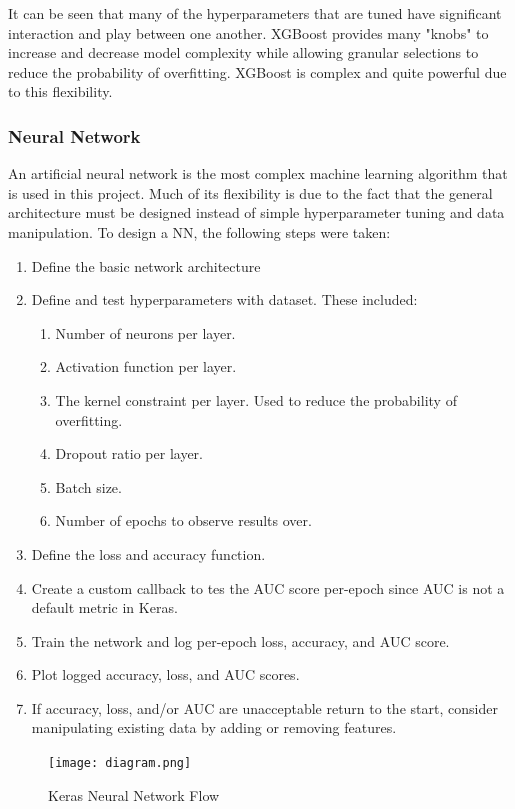 \documentclass[11pt]{article}
\begin{document}
	It can be seen that many of the hyperparameters that are tuned have significant interaction and play between one another. XGBoost provides many "knobs" to increase and decrease model complexity while allowing granular selections to reduce the probability of overfitting. XGBoost is complex and quite powerful due to this flexibility.
	
	\subsubsection{Neural Network}

    An artificial neural network is the most complex machine learning algorithm that is used in this project. Much of its flexibility is due to the fact that the general architecture must be designed instead of simple hyperparameter tuning and data manipulation. To design a NN, the following steps were taken:
	
	\begin{enumerate}
		\item Define the basic network architecture
		\item Define and test hyperparameters with dataset. These included:
			\begin{enumerate}
				\item Number of neurons per layer.
				\item Activation function per layer.
				\item The kernel constraint per layer. Used to reduce the probability of overfitting.
				\item Dropout ratio per layer. 
				\item Batch size.
				\item Number of epochs to observe results over.
			\end{enumerate}
		\item Define the loss and accuracy function.
		\item Create a custom callback to tes the AUC score per-epoch since AUC is not a default metric in Keras.
		\item Train the network and log per-epoch loss, accuracy, and AUC score.
		\item Plot logged accuracy, loss, and AUC scores.
		\item If accuracy, loss, and/or AUC are unacceptable return to the start, consider manipulating existing data by adding or removing features.
	\end{enumerate}
		
	\begin{figure}
		\begin{center}
			\texttt{[image: diagram.png]}
		\end{center}
		\caption{Keras Neural Network Flow}
	\end{figure}
\end{document}
